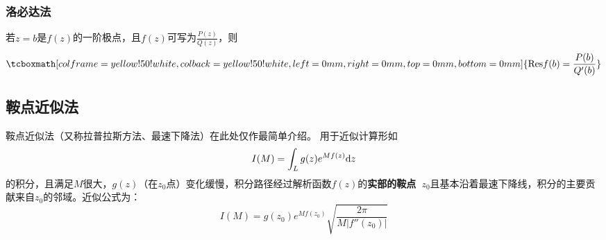 \documentclass[UTF8,12pt]{ctexart}
\newcommand\stress{\tcboxmath[colframe=yellow!50!white,colback=yellow!50!white,left=0mm,right=0mm,top=0mm,bottom=0mm]}
\begin{document}
\subsubsection{洛必达法}
若$z=b$是$f(z)$的一阶极点，且$f(z)$可写为$\frac{P(z)}{Q(z)}$，则
\begin{equation}
    \stress{{\rm Res}f(b)=\frac{P(b)}{Q'(b)}}
\end{equation}
 
\subsection{鞍点近似法}
鞍点近似法（又称拉普拉斯方法、最速下降法）在此处仅作最简单介绍。
用于近似计算形如
\begin{equation}
    I(M)=\int_Lg(z)e^{Mf(z)}{\rm d}z
\end{equation}
的积分，且满足$M$很大，$g(z)$（在$z_0$点）变化缓慢，积分路径经过解析函数$f(z)$的{\bf 实部的鞍点\ }$z_0$且基本沿着最速下降线，积分的主要贡献来自$z_0$的邻域。近似公式为：
\begin{equation}
    I(M)=g(z_0) e^{Mf(z_0)}\sqrt{\frac{2\pi}{M|f''(z_0)|}}
\end{equation}
\end{document}
